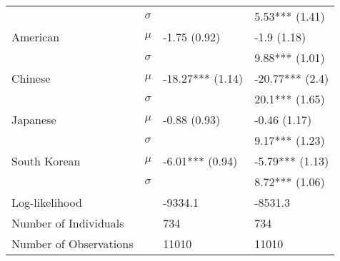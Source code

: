 \begin{tabular}{llll}
                       &  $\sigma$ &                                &                 5.53*** (1.41) \\
              American &     $\mu$ &                   -1.75 (0.92) &                    -1.9 (1.18) \\
                       &  $\sigma$ &                                &                 9.88*** (1.01) \\
               Chinese &     $\mu$ &               -18.27*** (1.14) &                -20.77*** (2.4) \\
                       &  $\sigma$ &                                &                 20.1*** (1.65) \\
              Japanese &     $\mu$ &                   -0.88 (0.93) &                   -0.46 (1.17) \\
                       &  $\sigma$ &                                &                 9.17*** (1.23) \\
          South Korean &     $\mu$ &                -6.01*** (0.94) &                -5.79*** (1.13) \\
                       &  $\sigma$ &                                &                 8.72*** (1.06) \\
 \hline Log-likelihood &           &                        -9334.1 &                        -8531.3 \\
 Number of Individuals &           &                            734 &                            734 \\
Number of Observations &           &                          11010 &                          11010 \\
\bottomrule
\end{tabular}
